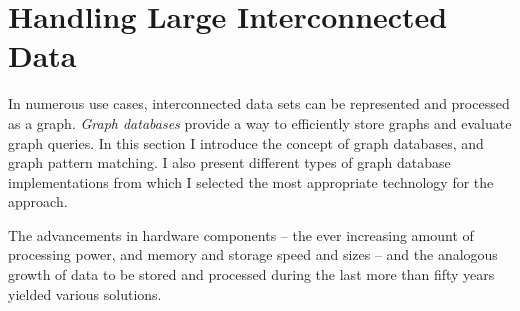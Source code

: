 \FloatBarrier

\section{Handling Large Interconnected Data}
In numerous use cases, interconnected data sets can be represented and processed as a graph. \emph{Graph databases} provide a way to efficiently store graphs and evaluate graph queries. In this section I introduce the concept of graph databases, and graph pattern matching. I also present different types of graph database implementations from which I selected the most appropriate technology for the approach.

The advancements in hardware components -- the ever increasing amount of processing power, and memory and storage speed and sizes -- and the analogous growth of data to be stored and processed during the last more than fifty years yielded various solutions.

